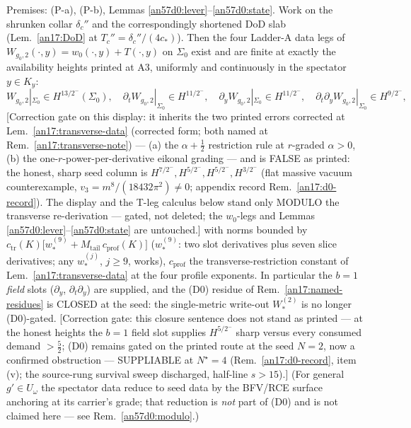 \begin{proposition}[(D0) executed: the Ladder-A seed Cauchy data at all
four slots, $b=1$ included]\label{an57d0:main}
Premises: (P-a), (P-b), Lemmas \ref{an57d0:lever}--\ref{an57d0:state}. Work
on the shrunken collar $\delta_c''$ and the correspondingly shortened DoD
slab (Lem.\ \ref{an17:DoD} at $T_c''=\delta_c''/(4c_*)$). Then the four Ladder-A
data legs of $W_{g_0,2}(\cdot,y)=w_0(\cdot,y)+T(\cdot,y)$ on $\Sigma_0$
exist and are finite at exactly the availability heights printed at A3, uniformly and continuously in the spectator $y\in K_y$:
\[
 W_{g_0,2}|_{\Sigma_0}\in H^{13/2^-}(\Sigma_0),\quad
 \partial_tW_{g_0,2}|_{\Sigma_0}\in H^{11/2^-},\quad
 \partial_yW_{g_0,2}|_{\Sigma_0}\in H^{11/2^-},\quad
 \partial_t\partial_yW_{g_0,2}|_{\Sigma_0}\in H^{9/2^-},
\]
\textup{[Correction gate on this display: it inherits the two printed errors
corrected at Lem.\ \ref{an17:transverse-data} (corrected form; both named at Rem.\
\ref{an17:transverse-note}) --- (a) the $\alpha+\tfrac12$ restriction rule at
$r$-graded $\alpha>0$, (b) the one-$r$-power-per-derivative eikonal grading
--- and is FALSE as printed: the honest, sharp seed column is
$H^{7/2^-},H^{5/2^-},H^{5/2^-},H^{3/2^-}$ (flat massive vacuum
counterexample, $v_3=m^8/(18432\pi^2)\neq0$; appendix record Rem.\
\ref{an17:d0-record}). The display and the T-leg calculus below stand only MODULO
the transverse re-derivation --- gated, not deleted; the $w_0$-legs and
Lemmas \ref{an57d0:lever}--\ref{an57d0:state} are untouched.]}
with norms bounded by
$c_{\mathrm{tr}}(K)\bigl[w_*^{(9)}+M_{\mathrm{tail}}\,
c_{\mathrm{prof}}(K)\bigr]$ ($w_*^{(9)}$: two slot derivatives plus seven
slice derivatives; any $w_*^{(j)}$, $j\ge9$, works), $c_{\mathrm{prof}}$ the
transverse-restriction constant of Lem.\ \ref{an17:transverse-data} at the four
profile exponents. In
particular the $b=1$ \emph{field} slots ($\partial_y$, $\partial_t\partial_y$)
are supplied, and the (D0) residue of Rem.~\ref{an17:named-residues} is
CLOSED at the seed: the single-metric write-out $W^{(2)}_*$ is no longer
(D0)-gated. \textup{[Correction gate: this closure sentence does not stand as
printed --- at the honest heights the $b{=}1$ field slot supplies $H^{5/2^-}$
sharp versus every consumed demand $>\tfrac52$; (D0) remains gated on the printed route at the seed $N{=}2$, now a
confirmed obstruction --- SUPPLIABLE at $N^\star{=}4$ (Rem.\ \ref{an17:d0-record},
item (v); the source-rung survival sweep discharged, half-line $s>15$).]} \textup{(For general $g'\in U_\omega$ the spectator data reduce
to seed data by the BFV/RCE surface anchoring at its carrier's grade; that
reduction is \emph{not} part of (D0) and is not claimed here --- see
Rem.~\ref{an57d0:modulo}.)}
\end{proposition}
